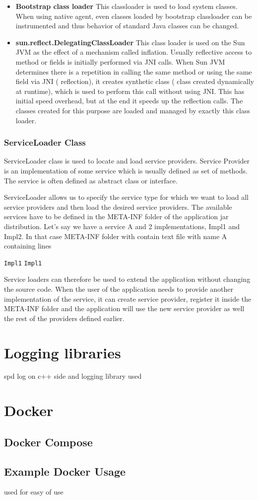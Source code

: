 \begin{itemize}
	\item\textbf{ Bootstrap class loader} \newline
	This classloader is used to load system classes. When using native agent, even classes loaded by bootstrap classloader can be instrumented and thus behavior of standard Java classes can be changed.
	
	\item  \textbf{sun.reflect.DelegatingClassLoader} \newline
	This class loader is used on the Sun JVM as the effect of a mechanism called inflation. Usually reflective access to method or fields is initially performed via JNI calls. When Sun JVM determines there is a repetition in calling the same method or using the same field via JNI ( reflection), it creates synthetic class ( class created dynamically at runtime), which is used to perform this call without using JNI. This has initial speed overhead, but at the end it speeds up the reflection calls.
	The classes created for this purpose are loaded and managed by exactly this class loader. 
\end{itemize}
\subsubsection{ServiceLoader Class}
ServiceLoader class is used to locate and load service providers. Service Provider is an implementation of some service which is usually defined as set of methods. The service is often defined as abstract class or interface. 

ServiceLoader allows us to specify the service type for which we want to load all service providers and then load the desired service providers. The available services have to be defined in the META-INF folder of the application jar distribution. Let's say we have a service A and 2 implementations, Impl1 and Impl2. In that case META-INF folder with contain text file with name A containing lines
\begin{center}
 \texttt{Impl1} \newline
\texttt{Impl1}  \newline
\end{center}
Service loaders can therefore be used to extend the application without changing the source code. When the user of the application needs to provide another implementation of the service, it can create service provider, register it inside the META-INF folder and the application will use the new service provider as well the rest of the providers defined earlier.
\section{Logging libraries}
spd log on c++ side and 
logging library used
\section{Docker}
\subsection{Docker Compose}
\subsection{Example Docker Usage}
used for easy of use
